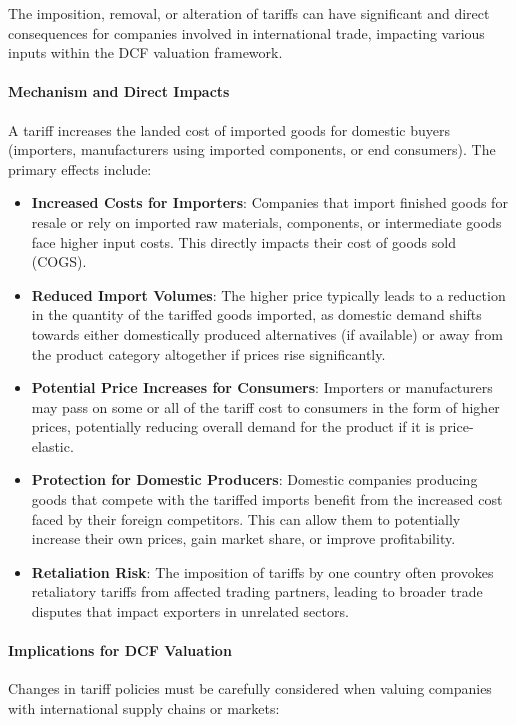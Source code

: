 The imposition, removal, or alteration of tariffs can have significant and direct consequences for companies involved in international trade, impacting various inputs within the DCF valuation framework.

\paragraph{Mechanism and Direct Impacts}
A tariff increases the landed cost of imported goods for domestic buyers (importers, manufacturers using imported components, or end consumers). The primary effects include:
\begin{itemize}
    \item \textbf{Increased Costs for Importers}: Companies that import finished goods for resale or rely on imported raw materials, components, or intermediate goods face higher input costs. This directly impacts their cost of goods sold (COGS).
    \item \textbf{Reduced Import Volumes}: The higher price typically leads to a reduction in the quantity of the tariffed goods imported, as domestic demand shifts towards either domestically produced alternatives (if available) or away from the product category altogether if prices rise significantly.
    \item \textbf{Potential Price Increases for Consumers}: Importers or manufacturers may pass on some or all of the tariff cost to consumers in the form of higher prices, potentially reducing overall demand for the product if it is price-elastic.
    \item \textbf{Protection for Domestic Producers}: Domestic companies producing goods that compete with the tariffed imports benefit from the increased cost faced by their foreign competitors. This can allow them to potentially increase their own prices, gain market share, or improve profitability.
    \item \textbf{Retaliation Risk}: The imposition of tariffs by one country often provokes retaliatory tariffs from affected trading partners, leading to broader trade disputes that impact exporters in unrelated sectors.
\end{itemize}

\paragraph{Implications for DCF Valuation}
Changes in tariff policies must be carefully considered when valuing companies with international supply chains or markets:

